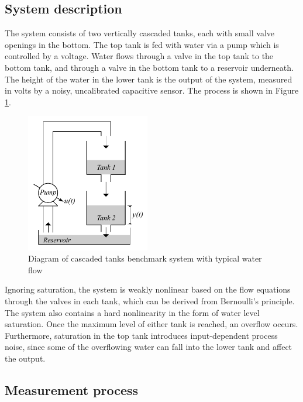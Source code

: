 \subsection{System description}

The system consists of two vertically cascaded tanks, each with small valve openings in the bottom. The top tank is fed with water via a pump which is controlled by a voltage. Water flows through a valve in the top tank to the bottom tank, and through a valve in the bottom tank to a reservoir underneath. The height of the water in the lower tank is the output of the system, measured in volts by a noisy, uncalibrated capacitive sensor. The process is shown in Figure \ref{fig:System_Tanks}. 

\begin{figure}[h]
\centering
\includegraphics[width=0.48\textwidth]{Chapter6_CaseStudies/TanksSchematic.pdf}
\caption{Diagram of cascaded tanks benchmark system with typical water flow}
\label{fig:System_Tanks}
\end{figure}

Ignoring saturation, the system is weakly nonlinear based on the flow equations through the valves in each tank, which can be derived from Bernoulli's principle. The system also contains a hard nonlinearity in the form of water level saturation. Once the maximum level of either tank is reached, an overflow occurs. Furthermore, saturation in the top tank introduces input-dependent process noise, since some of the overflowing water can fall into the lower tank and affect the output. 

\subsection{Measurement process}

